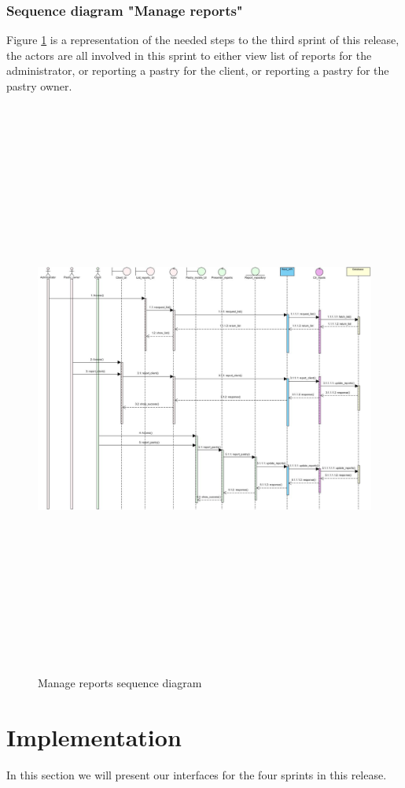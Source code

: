 \documentclass[12pt,a4paper]{report}
\begin{document}
\subsubsection*{Sequence diagram "Manage reports"}
Figure \ref{reports-sequence} is a representation of the needed steps to the third sprint of this release, the actors are all involved in this sprint to either view list of reports for the administrator, or reporting a pastry for the client, or reporting a pastry for the pastry owner.
\begin{figure}[H]
	\centering
	\includegraphics[width=7in,height=7.5in]{managerepors.jpg}
	\caption{Manage reports sequence diagram}
	\label{reports-sequence}
\end{figure}
\clearpage
	\section{Implementation}
	In this section we will present our interfaces for the four sprints in this release.
\end{document}
